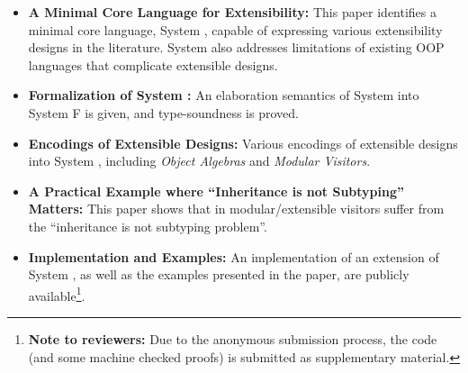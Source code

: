 \begin{comment}
\george{Typing extensible records with a minimalistic design might also be of
  interest. We manage to achieve all what Daan Leijen achieved in
  \url{http://research.microsoft.com/pubs/65409/scopedlabels.pdf} except field
  renaming, with simpler approach.}
\end{comment}

\begin{itemize}

\item {\bf A Minimal Core Language for Extensibility:} This paper
  identifies a minimal core language, System \name, capable of
  expressing various extensibility designs in the literature.
  System \name also addresses limitations of existing OOP
  languages that complicate extensible designs. 
  
\item {\bf Formalization of System \name:} An elaboration semantics of
  System \name into System F is given, and type-soundness is proved.

\item {\bf Encodings of Extensible Designs:} Various encodings of
  extensible designs into System \name, including \emph{Object
    Algebras} and \emph{Modular Visitors}. 

\item {\bf A Practical Example where ``Inheritance is not Subtyping''
    Matters:} This paper shows that in modular/extensible visitors
  suffer from the ``inheritance is not subtyping problem''. 

\item {\bf Implementation and Examples:} An implementation of an
  extension of System \name, as well as the examples presented in the
  paper, are publicly available\footnote{{\bf Note to reviewers:} Due
    to the anonymous submission process, the code (and some machine
    checked proofs) is submitted as supplementary material.}. 

\begin{comment}

\item{elaboration typing rules which given a source expression with intersection
    types, typecheck and translate it into an ordinary F term. Prove a type
    preservation result: if a term $ e $ has type $ \tau $ in the source language,
    then the translated term $ \im e $ is well-typed and has type $ \im \tau $ in the
    target language.}

\item{present an algorithm for detecting incoherence which can be very important
    in practice.}

\item{explores the connection between intersection types and object algebra by
    showing various examples of encoding object algebra with intersection
    types.}

\end{comment}

\end{itemize}

